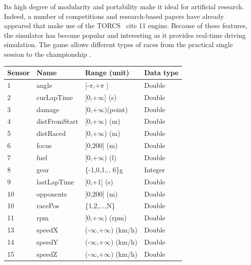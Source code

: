 \documentclass[runningheads,a4paper]{llncs}
\begin{document}
Its high degree of modularity and portability make it ideal for artificial research. Indeed, a number of competitions and research-based papers have already appeared that make use of the TORCS \ cite {11} engine. Because of these features, the simulator has become popular and interesting as it provides real-time driving simulation. \cite{24} The game allows different types of races from the practical single session to the championship \cite{10}.
	\begin{table}[ht!]
		{\scriptsize
			{\centering
				\begin{tabular}{|p{2cm}|p{3cm}|p{3 cm}|p{3 cm}|}
					\hline
					{\textbf{Sensor} }&
					{\textbf{Name} }&
					{\textbf{Range} (unit)} &  
					{\textbf{Data type}}\\ 
					\hline
					1 & angle & [-$\pi$,+$\pi$ ] & Double\\ 
					\hline
					2 & curLapTime & [0,+$\infty$] (s)	& Double\\ 
					\hline 
					3 & damage & [0,+$\infty$)(point)& Double\\ 
					\hline 
					4 & distFromStart & [0,+$\infty$) (m)& Double \\ 
					\hline 
					5 & distRaced &[0,+$\infty$) (m)& Double\\
					\hline 
					
					6 & focus & [0,200] (m)& Double\\
					\hline 
					
					7 & fuel & [0,+$\infty$) (l)& Double\\
					
					\hline
					8 & gear & \{-1,0,1,.. 6\}g& Integer \\
					
					\hline
					9 & lastLapTime &[0,+1] (s) & Double \\
					
					\hline
					10 & opponents &[0,200] (m)& Double \\
					
					\hline
					10 & racePos & \{1,2,...,N\} & Double \\
					\hline
					11 & rpm    & [0,+$\infty$) (rpm)   & Double \\
					\hline  
					13 & speedX & (-$\infty$,+$\infty$) (km/h) & Double\\
					\hline  
					14 & speedY &(-$\infty$,+$\infty$) (km/h)  & Double\\
					\hline 
					15 & speedZ & (-$\infty$,+$\infty$) (km/h) & Double \\
					

\end{tabular}}}
\end{table}
\end{document}
